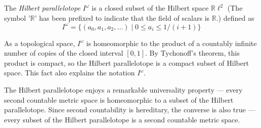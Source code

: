 \documentclass[12pt]{article}
\begin{document}
The \emph{Hilbert parallelotope} $I^\omega$ is a closed subset of the Hilbert space $\mathbb{R} \ell^2$ (The symbol '$\mathbb{R}$' has been prefixed to indicate that the field of scalars is $\mathbb{R}$.) defined as
 $$I^\omega = \{(a_0, a_1, a_2, \ldots) \mid 0 \le a_i \le 1/(i+1) \}$$

As a topological space, $I^\omega$ is homeomorphic to the product of a countably infinite number of copies of the closed interval $[0,1]$.  By Tychonoff's theorem, this product is compact, so the Hilbert parallelotope is a compact subset of Hilbert space.  This fact also explains the notation $I^\omega$.

The Hilbert parallelotope enjoys a remarkable universality property --- every second countable metric space is homeomorphic to a subset of the Hilbert parallelotope.  Since second countability is hereditary, the converse is also true --- every subset of the Hilbert parallelotope is a second countable metric space.
\end{document}
